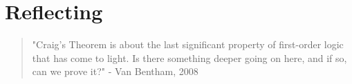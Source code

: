 \documentclass{article}
\begin{document}
\section{Reflecting}

\begin{quote}
  "Craig's Theorem is about the last significant property of first-order logic
   that has come to light. Is there something deeper going on here, and if so,
   can we prove it?" - Van Bentham, 2008
\end{quote}

\vfill{}
\footnotesize




\end{document}
